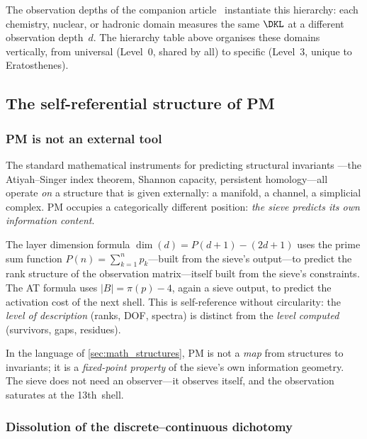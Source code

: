 \documentclass[12pt,a4paper]{article}
\begin{document}
\begin{remark}
The observation depths of the companion article~\cite{companion_chemistry} instantiate this
hierarchy: each chemistry, nuclear, or hadronic domain measures the same
$\DKL$ at a different observation depth~$d$.  The hierarchy table above
organises these domains vertically, from universal (Level~0, shared by
all) to specific (Level~3, unique to Eratosthenes).
\end{remark}


\subsection{The self-referential structure of PM}
\label{sec:PM_self}

\subsubsection{PM is not an external tool}

The standard mathematical instruments for predicting structural invariants
---the Atiyah--Singer index theorem, Shannon capacity, persistent
homology---all operate \emph{on} a structure that is given externally: a
manifold, a channel, a simplicial complex.  PM occupies a categorically
different position: \emph{the sieve predicts its own information content}.

The layer dimension formula $\dim(d) = P(d{+}1) - (2d{+}1)$ uses the prime
sum function $P(n) = \sum_{k=1}^n p_k$---built from the sieve's output---to predict the rank
structure of the observation matrix---itself built from the sieve's
constraints.  The AT formula uses $|B| = \pi(p) - 4$, again a sieve output,
to predict the activation cost of the next shell.  This is self-reference
without circularity: the \emph{level of description} (ranks, DOF, spectra)
is distinct from the \emph{level computed} (survivors, gaps, residues).

\begin{remark}
In the language of \cref{sec:math_structures}, PM is not a
\emph{map} from structures to invariants; it is a \emph{fixed-point property}
of the sieve's own information geometry.  The sieve does not need an
observer---it observes itself, and the observation saturates at the
13th~shell.
\end{remark}

\subsubsection{Dissolution of the discrete--continuous dichotomy}
\end{document}
